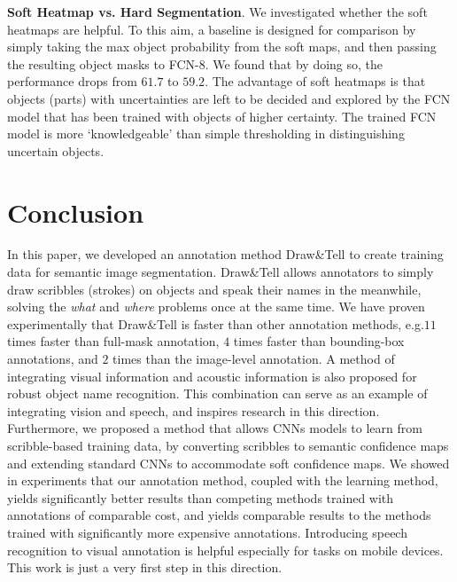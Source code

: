 \documentclass[runningheads]{llncs}
\makeatletter
\newcommand*{\eg}{e.g.\@\xspace}
\makeatother
\begin{document}
\textbf{Soft Heatmap vs. Hard Segmentation}. We investigated whether the soft heatmaps are helpful. To this aim, a baseline is designed for comparison by simply taking the max object probability from the soft maps, and then passing the resulting object masks to FCN-8.  We found that by doing so, the performance drops from $61.7$ to $59.2$. The advantage of soft heatmaps is that  objects (parts) with uncertainties are left to be decided and explored by the FCN model that has been trained with objects of higher certainty. The trained FCN model is more ‘knowledgeable’ than simple thresholding in distinguishing uncertain objects. 


\section{Conclusion}
\label{sec:con}
In this paper, we developed an annotation method Draw\&Tell to create
training data for semantic image segmentation. Draw\&Tell allows
annotators to simply draw scribbles (strokes) on objects and speak
their names in the meanwhile, solving the \emph{what} and \emph{where}
problems once at the same time. We have proven experimentally that
Draw\&Tell is faster than other annotation methods, \eg $11$ times
faster than full-mask annotation, $4$ times faster than bounding-box
annotations, and $2$ times than the image-level annotation. A method of integrating  visual information and acoustic information is also proposed for robust object name recognition. This combination can serve as an example of integrating vision and speech, and inspires research in this direction. Furthermore, we proposed a method that allows CNNs models to learn from scribble-based training data, by converting scribbles to semantic confidence maps and extending standard CNNs to accommodate soft confidence maps.
We showed in experiments that our annotation method, coupled with the learning method, yields significantly better results than competing methods  
trained with annotations of comparable cost, and yields comparable results to the methods trained with significantly more expensive
annotations.  Introducing speech recognition to visual annotation is
helpful especially for tasks on mobile devices. This work is just a very first step in this direction. 




\end{document}
